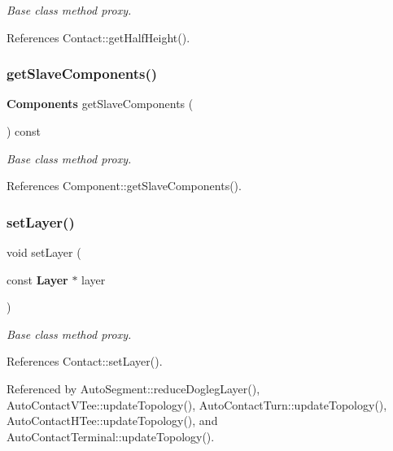 {\itshape Base class method proxy.} 

References Contact\+::get\+Half\+Height().

\mbox{\label{classKatabatic_1_1AutoContact_ad59f45aaefd5acc8fb9795d4c0e49a7f}} 
\subsubsection{\texorpdfstring{get\+Slave\+Components()}{getSlaveComponents()}}
{\footnotesize\ttfamily \textbf{ Components} get\+Slave\+Components (\begin{DoxyParamCaption}{ }\end{DoxyParamCaption}) const\hspace{0.3cm}{\ttfamily [inline]}}

{\itshape Base class method proxy.} 

References Component\+::get\+Slave\+Components().

\mbox{\label{classKatabatic_1_1AutoContact_aad4271c35e0162c8a4d034dca07f5a4b}} 
\subsubsection{\texorpdfstring{set\+Layer()}{setLayer()}}
{\footnotesize\ttfamily void set\+Layer (\begin{DoxyParamCaption}\item[{const \textbf{ Layer} $\ast$}]{layer }\end{DoxyParamCaption})\hspace{0.3cm}{\ttfamily [inline]}}

{\itshape Base class method proxy.} 

References Contact\+::set\+Layer().



Referenced by Auto\+Segment\+::reduce\+Dogleg\+Layer(), Auto\+Contact\+V\+Tee\+::update\+Topology(), Auto\+Contact\+Turn\+::update\+Topology(), Auto\+Contact\+H\+Tee\+::update\+Topology(), and Auto\+Contact\+Terminal\+::update\+Topology().

